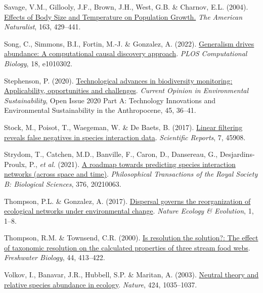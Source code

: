 \documentclass[10pt,oneside]{article}
\newlength{\cslhangindent}
\newenvironment{CSLReferences}[3] %
 {%
  \setlength{\parindent}{0pt}
  \ifodd #1 \everypar{\setlength{\hangindent}{\cslhangindent}}\ignorespaces\fi
  \ifnum #2 > 0
  \setlength{\parskip}{#2\baselineskip}
  \fi
 }%
 {}
\begin{document}
\begin{CSLReferences}{1}{0}
\leavevmode{}%
Savage, V.M., Gillooly, J.F., Brown, J.H., West, G.B. \& Charnov, E.L.
(2004). \href{https://doi.org/10.1086/381872}{Effects of Body Size and
Temperature on Population Growth.} \emph{The American Naturalist}, 163,
429--441.

\leavevmode{}%
Song, C., Simmons, B.I., Fortin, M.-J. \& Gonzalez, A. (2022).
\href{https://doi.org/10.1371/journal.pcbi.1010302}{Generalism drives
abundance: A computational causal discovery approach}. \emph{PLOS
Computational Biology}, 18, e1010302.

\leavevmode{}%
Stephenson, P. (2020).
\href{https://doi.org/10.1016/j.cosust.2020.08.005}{Technological
advances in biodiversity monitoring: Applicability, opportunities and
challenges}. \emph{Current Opinion in Environmental Sustainability},
Open Issue 2020 Part A: Technology Innovations and Environmental
Sustainability in the Anthropocene, 45, 36--41.

\leavevmode{}%
Stock, M., Poisot, T., Waegeman, W. \& De Baets, B. (2017).
\href{https://doi.org/10.1038/srep45908}{Linear filtering reveals false
negatives in species interaction data}. \emph{Scientific Reports}, 7,
45908.

\leavevmode{}%
Strydom, T., Catchen, M.D., Banville, F., Caron, D., Dansereau, G.,
Desjardins-Proulx, P., \emph{et al.} (2021).
\href{https://doi.org/10.1098/rstb.2021.0063}{A roadmap towards
predicting species interaction networks (across space and time)}.
\emph{Philosophical Transactions of the Royal Society B: Biological
Sciences}, 376, 20210063.

\leavevmode{}%
Thompson, P.L. \& Gonzalez, A. (2017).
\href{https://doi.org/10.1038/s41559-017-0162}{Dispersal governs the
reorganization of ecological networks under environmental change}.
\emph{Nature Ecology \& Evolution}, 1, 1--8.

\leavevmode{}%
Thompson, R.M. \& Townsend, C.R. (2000).
\href{https://doi.org/10.1046/j.1365-2427.2000.00579.x}{Is resolution
the solution?: The effect of taxonomic resolution on the calculated
properties of three stream food webs}. \emph{Freshwater Biology}, 44,
413--422.

\leavevmode{}%
Volkov, I., Banavar, J.R., Hubbell, S.P. \& Maritan, A. (2003).
\href{https://doi.org/10.1038/nature01883}{Neutral theory and relative
species abundance in ecology}. \emph{Nature}, 424, 1035--1037.


\end{CSLReferences}
\end{document}
